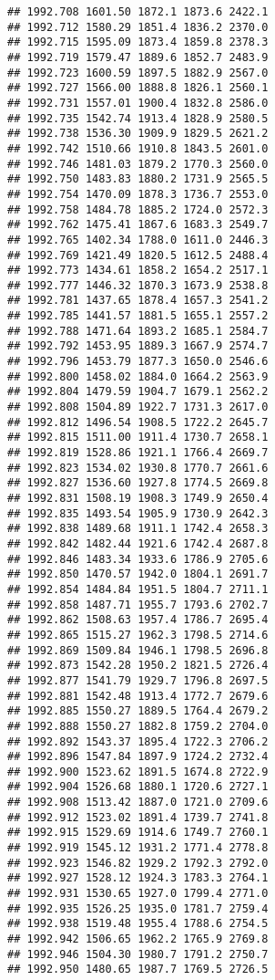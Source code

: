 \documentclass[
]{article}
\begin{document}
\begin{verbatim}
## 1992.708 1601.50 1872.1 1873.6 2422.1
## 1992.712 1580.29 1851.4 1836.2 2370.0
## 1992.715 1595.09 1873.4 1859.8 2378.3
## 1992.719 1579.47 1889.6 1852.7 2483.9
## 1992.723 1600.59 1897.5 1882.9 2567.0
## 1992.727 1566.00 1888.8 1826.1 2560.1
## 1992.731 1557.01 1900.4 1832.8 2586.0
## 1992.735 1542.74 1913.4 1828.9 2580.5
## 1992.738 1536.30 1909.9 1829.5 2621.2
## 1992.742 1510.66 1910.8 1843.5 2601.0
## 1992.746 1481.03 1879.2 1770.3 2560.0
## 1992.750 1483.83 1880.2 1731.9 2565.5
## 1992.754 1470.09 1878.3 1736.7 2553.0
## 1992.758 1484.78 1885.2 1724.0 2572.3
## 1992.762 1475.41 1867.6 1683.3 2549.7
## 1992.765 1402.34 1788.0 1611.0 2446.3
## 1992.769 1421.49 1820.5 1612.5 2488.4
## 1992.773 1434.61 1858.2 1654.2 2517.1
## 1992.777 1446.32 1870.3 1673.9 2538.8
## 1992.781 1437.65 1878.4 1657.3 2541.2
## 1992.785 1441.57 1881.5 1655.1 2557.2
## 1992.788 1471.64 1893.2 1685.1 2584.7
## 1992.792 1453.95 1889.3 1667.9 2574.7
## 1992.796 1453.79 1877.3 1650.0 2546.6
## 1992.800 1458.02 1884.0 1664.2 2563.9
## 1992.804 1479.59 1904.7 1679.1 2562.2
## 1992.808 1504.89 1922.7 1731.3 2617.0
## 1992.812 1496.54 1908.5 1722.2 2645.7
## 1992.815 1511.00 1911.4 1730.7 2658.1
## 1992.819 1528.86 1921.1 1766.4 2669.7
## 1992.823 1534.02 1930.8 1770.7 2661.6
## 1992.827 1536.60 1927.8 1774.5 2669.8
## 1992.831 1508.19 1908.3 1749.9 2650.4
## 1992.835 1493.54 1905.9 1730.9 2642.3
## 1992.838 1489.68 1911.1 1742.4 2658.3
## 1992.842 1482.44 1921.6 1742.4 2687.8
## 1992.846 1483.34 1933.6 1786.9 2705.6
## 1992.850 1470.57 1942.0 1804.1 2691.7
## 1992.854 1484.84 1951.5 1804.7 2711.1
## 1992.858 1487.71 1955.7 1793.6 2702.7
## 1992.862 1508.63 1957.4 1786.7 2695.4
## 1992.865 1515.27 1962.3 1798.5 2714.6
## 1992.869 1509.84 1946.1 1798.5 2696.8
## 1992.873 1542.28 1950.2 1821.5 2726.4
## 1992.877 1541.79 1929.7 1796.8 2697.5
## 1992.881 1542.48 1913.4 1772.7 2679.6
## 1992.885 1550.27 1889.5 1764.4 2679.2
## 1992.888 1550.27 1882.8 1759.2 2704.0
## 1992.892 1543.37 1895.4 1722.3 2706.2
## 1992.896 1547.84 1897.9 1724.2 2732.4
## 1992.900 1523.62 1891.5 1674.8 2722.9
## 1992.904 1526.68 1880.1 1720.6 2727.1
## 1992.908 1513.42 1887.0 1721.0 2709.6
## 1992.912 1523.02 1891.4 1739.7 2741.8
## 1992.915 1529.69 1914.6 1749.7 2760.1
## 1992.919 1545.12 1931.2 1771.4 2778.8
## 1992.923 1546.82 1929.2 1792.3 2792.0
## 1992.927 1528.12 1924.3 1783.3 2764.1
## 1992.931 1530.65 1927.0 1799.4 2771.0
## 1992.935 1526.25 1935.0 1781.7 2759.4
## 1992.938 1519.48 1955.4 1788.6 2754.5
## 1992.942 1506.65 1962.2 1765.9 2769.8
## 1992.946 1504.30 1980.7 1791.2 2750.7
## 1992.950 1480.65 1987.7 1769.5 2726.5

\end{verbatim}
\end{document}
